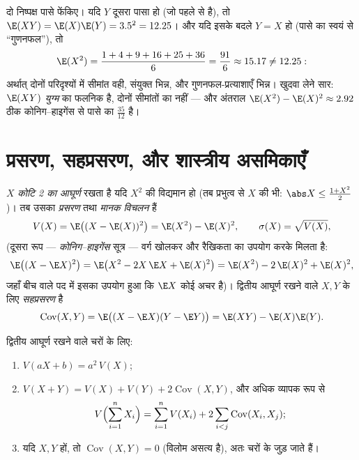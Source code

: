 \begin{example}[गुणनफल, स्वतंत्रता के साथ और
बिना]\label{ex:b2:randomvar:productcontrast}
दो निष्पक्ष पासे फेंकिए। यदि $Y$ दूसरा पासा हो (जो पहले से
 है), तो $\E(XY) = \E(X)\E(Y) = 3.5^2 = 12.25$। और यदि इसके बदले $Y = X$ हो (पासे का स्वयं से
``गुणनफल''), तो
\[
\E(X^2) = \frac{1 + 4 + 9 + 16 + 25 + 36}{6} = \frac{91}{6}
\approx 15.17 \neq 12.25 :
\]
अर्थात् दोनों परिदृश्यों में सीमांत  वही, संयुक्त  भिन्न,
और गुणनफल-प्रत्याशाएँ भिन्न। खुदवा लेने  सार: $\E(XY)$ \emph{युग्म}
का फलनिक है, दोनों सीमांतों का नहीं --- और अंतराल $\E(X^2) - \E(X)^2 \approx 2.92$ ठीक
कोनिग--हाइगेंस से पासे का  $\frac{35}{12}$ है।
\end{example}

\section{प्रसरण, सहप्रसरण, और शास्त्रीय असमिकाएँ}

\begin{definition}[आघूर्ण, प्रसरण]\label{def:b2:randomvar:variance}
$X$ \emph{कोटि 2 का आघूर्ण} रखता है यदि $X^2$ की  विद्यमान
हो (तब प्रभुत्व से $X$ की भी: $\abs X \leq \frac{1 +
X^2}{2}$)। तब उसका
\emph{प्रसरण} तथा \emph{मानक
विचलन} हैं
\[
V(X) = \E\bigl((X - \E(X))^2\bigr)
= \E(X^2) - \E(X)^2 ,
\qquad
\sigma(X) = \sqrt{V(X)} ,
\]
(दूसरा रूप --- \emph{कोनिग--हाइगेंस} सूत्र --- वर्ग खोलकर और
रैखिकता का उपयोग करके मिलता है:
\[
\E\bigl((X - \E X)^2\bigr)
= \E\bigl(X^2 - 2X\,\E X + \E(X)^2\bigr)
= \E(X^2) - 2\,\E(X)^2 + \E(X)^2 ,
\]
जहाँ बीच वाले पद में इसका उपयोग हुआ कि $\E X$ कोई अचर है)। द्वितीय
आघूर्ण रखने वाले $X, Y$ के लिए \emph{सहप्रसरण} है
\[
\operatorname{Cov}(X, Y)
= \E\bigl((X - \E X)(Y - \E Y)\bigr)
= \E(XY) - \E(X)\E(Y) .
\]
\end{definition}

\begin{theorem}[प्रसरण की औज़ार-पेटी]\label{thm:b2:randomvar:variancerules}
द्वितीय आघूर्ण रखने वाले चरों के लिए:
\begin{enumerate}
\item $V(aX + b) = a^2\,V(X)$;
\item $V(X + Y) = V(X) + V(Y) + 2\operatorname{Cov}(X, Y)$, और अधिक व्यापक रूप से
\[
V\Bigl(\sum_{i=1}^n X_i\Bigr)
= \sum_{i=1}^n V(X_i)
+ 2\sum_{i < j}\operatorname{Cov}(X_i, X_j) ;
\]
\item यदि $X, Y$  हों, तो $\operatorname{Cov}(X, Y) = 0$ (विलोम असत्य है), अतः 
चरों के  जुड़ जाते हैं।
\end{enumerate}
\end{theorem}

